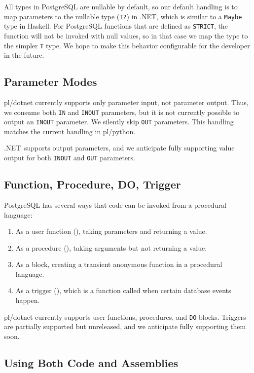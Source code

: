 \documentclass[sigconf,techreport,authorversion,nonacm]{acmart}
\newcommand{\dotnet}{.NET}
\begin{document}
All types in PostgreSQL are nullable by default, so our default
handling is to map parameters to the nullable type (\texttt{T?}) in \dotnet,
which is similar to a \texttt{Maybe} type in Haskell. For PostgreSQL
functions that are defined as \texttt{STRICT}, the function will not be
invoked with null values, so in that case we map the type to the
simpler \texttt{T} type. We hope to make this behavior configurable for
the developer in the future.

\subsection{Parameter Modes}

pl/dotnet currently supports only parameter input, not parameter
output. Thus, we consume both \texttt{IN} and \texttt{INOUT} parameters,
but it is not currently possible to output an \texttt{INOUT} parameter.
We silently skip \texttt{OUT} parameters. This handling matches
the current handling in pl/python.

\dotnet\ supports output parameters, and we anticipate fully
supporting value output for both \texttt{INOUT} and \texttt{OUT} parameters.

\subsection{Function, Procedure, DO, Trigger}

PostgreSQL has several ways that code can be invoked from a procedural
language:
\begin{enumerate}[itemsep=0pt]
    \item As a user function (), taking parameters and returning a value.
    \item As a procedure (), taking arguments but not returning a value.
    \item As a  block, creating a transient anonymous function in a procedural language.
    \item As a trigger (), which is a function called when certain database events happen.
\end{enumerate}

pl/dotnet currently supports user functions, procedures, and \texttt{DO} blocks.
Triggers are partially supported but unreleased, and we anticipate
fully supporting them soon.

\subsection{Using Both Code and Assemblies}
\end{document}
